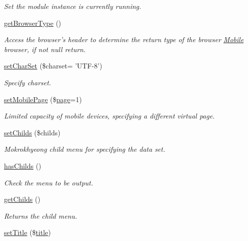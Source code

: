 \begin{DoxyCompactItemize}
\begin{DoxyCompactList}\small\item\em Set the module instance is currently running. \end{DoxyCompactList}\item 
\hyperlink{classmobileXE_a462a4900af63aa2bfbcea2168afbe876}{get\+Browser\+Type} ()
\begin{DoxyCompactList}\small\item\em Access the browser's header to determine the return type of the browser \hyperlink{classMobile}{Mobile} browser, if not null return. \end{DoxyCompactList}\item 
\hyperlink{classmobileXE_ad12dcc0e8a5dd3a507587516e3a62f2a}{set\+Char\+Set} (\$charset= 'U\+T\+F-\/8')
\begin{DoxyCompactList}\small\item\em Specify charset. \end{DoxyCompactList}\item 
\hyperlink{classmobileXE_a462ec879b69ab476662754aec66800dd}{set\+Mobile\+Page} (\$\hyperlink{classpage}{page}=1)
\begin{DoxyCompactList}\small\item\em Limited capacity of mobile devices, specifying a different virtual page. \end{DoxyCompactList}\item 
\hyperlink{classmobileXE_a0ea0dec157552b699d23388b257d22a6}{set\+Childs} (\$childs)
\begin{DoxyCompactList}\small\item\em Mokrokhyeong child menu for specifying the data set. \end{DoxyCompactList}\item 
\hyperlink{classmobileXE_a680f6a6b774bf12be4c67b6a9215f1ea}{has\+Childs} ()
\begin{DoxyCompactList}\small\item\em Check the menu to be output. \end{DoxyCompactList}\item 
\hyperlink{classmobileXE_a650f04e4701a5a1ae2ddceeb0f401166}{get\+Childs} ()
\begin{DoxyCompactList}\small\item\em Returns the child menu. \end{DoxyCompactList}\item 
\hyperlink{classmobileXE_a6ae064d89d2b926d7c96f59257692a01}{set\+Title} (\$\hyperlink{ko_8install_8php_a5b072c5fd1d2228c6ba5cee13cd142e3}{title})

\end{DoxyCompactItemize}
